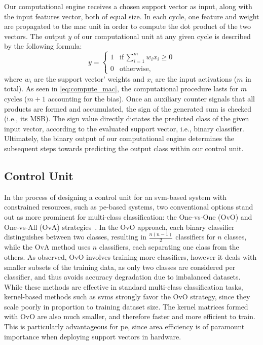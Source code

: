 Our computational engine receives a chosen support vector as input, along with the input features vector, both of equal size.
In each cycle, one feature and weight are propagated to the \gls{mac} unit in order to compute the dot product of the two vectors.
The output $y$ of our computational unit at any given cycle is described by the following formula:
\begin{equation}
    y = \begin{cases}
        1 & \text{if}\, \sum_{i=1}^{m} w_i x_i \geq 0 \\
        0 & \text{otherwise,}
    \end{cases}
\label{eq:compute_mac}
\end{equation}
where $w_i$ are the support vector' weights and $x_i$ are the input activations ($m$ in total).
As seen in \cref{eq:compute_mac}, the computational procedure lasts for $m$ cycles ($m+1$ accounting for the bias).
Once an auxiliary counter signals that all products are formed and accumulated, the sign of the generated sum is checked (i.e., its MSB).
The sign value directly dictates the predicted class of the given input vector, according to the evaluated support vector, i.e., binary classifier.
Ultimately, the binary output of our computational engine determines the subsequent steps towards predicting the output class within our control unit.


\subsection{Control Unit}
\label{sec:control_unit}

In the process of designing a control unit for an \gls{svm}-based system with constrained resources, such as \gls{pe}-based systems, two conventional options stand out as more prominent for multi-class classification: the One-vs-One (OvO) and One-vs-All (OvA) strategies~\cite{bishop2006pattern:ovo_ova}.
In the OvO approach, each binary classifier distinguishes between two classes, resulting in \( \frac{n(n-1)}{2} \) classifiers for $n$ classes, while the OvA method uses $n$ classifiers, each separating one class from the others.
As observed, OvO involves training more classifiers, however it deals with smaller subsets of the training data, as only two classes are considered per classifier, and thus avoids accuracy degradation due to imbalanced datasets.
While these methods are effective in standard multi-class classification tasks, kernel-based methods such as \glspl{svm} strongly favor the OvO strategy, since they scale poorly in proportion to training dataset size.
The kernel matrices formed with OvO are also much smaller, and therefore faster and more efficient to train.
This is particularly advantageous for \gls{pe}, since area efficiency is of paramount importance when deploying support vectors in hardware.

